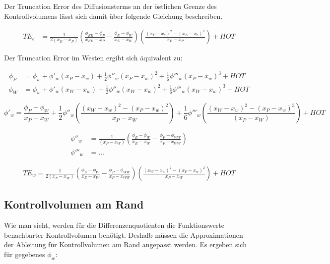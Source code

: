 \documentclass[10pt, ngerman,colorback,accentcolor=tud2d]{tudreport}
\begin{document}
Der Truncation Error des Diffusionsterms an der östlichen Grenze des Kontrollvolumens
lässt sich damit über folgende Gleichung beschreiben.

\begin{align*}
  {TE}_e &= \frac{1}{2 (x_E-x_P)}\left({
\frac{\phi_{EE}-\phi_P}{x_{EE}-x_P}-\frac{\phi_E-\phi_W}{x_E-x_W}}\right) \left({\frac{{(x_P-x_e)}^2-{(x_E-x_e)}^2}{x_E-x_P}}\right)+HOT
\end{align*}

Der Truncation Error im Westen ergibt sich äquivalent zu:

\begin{align}
  \phi_P &= \phi_w + \phi'_w(x_P-x_w)+\frac{1}{2}\phi''_w(x_P-x_w)^2
  +\frac{1}{6}\phi'''_w(x_P-x_w)^3+HOT
  \label{eq:taylor_wP}\\
  \phi_W &= \phi_w + \phi'_w(x_W-x_w)+\frac{1}{2}\phi''_w(x_W-x_w)^2
  +\frac{1}{6}\phi'''_w(x_W-x_w)^3+HOT
  \label{eq:taylor_eP}
\end{align}

\begin{equation}
  \phi'_w = \frac{\phi_P-\phi_W}{x_P-x_W}+\frac{1}{2}\phi''_w
\left({\frac{{(x_W-x_w)}^2-{(x_P-x_w)}^2}{x_P-x_W}}\right)+
\frac{1}{6} \phi'''_w \left({\frac{{(x_W-x_w)}^3-{(x_P-x_w)}^3}{(x_P-x_W)}}\right)+HOT
\end{equation}

\begin{align*}
  \phi''_w &= \frac{1}{(x_P-x_W)}\left({
\frac{\phi_{E}-\phi_W}{x_{E}-x_W}-\frac{\phi_P-\phi_{WW}}{x_P-x_{WW}}}\right)\\
 \phi'''_w &= \dots
\end{align*}

\begin{align*}
  TE_w = \frac{1}{2 (x_P-x_W)} \left({
\frac{\phi_{E}-\phi_W}{x_{E}-x_W}-\frac{\phi_P-\phi_{WW}}{x_P-x_{WW}}}\right)
  \left({\frac{{(x_W-x_w)}^2-{(x_P-x_w)}^2}{x_P-x_W}}\right)+HOT
\end{align*}

\subsection{Kontrollvolumen am Rand}

Wie man sieht, werden für die Differenzenquotienten die Funktionswerte benachbarter
Kontrollvolumen benötigt. Deshalb müssen die Approximationen der Ableitung für
Kontrollvolumen am Rand angepasst werden. Es ergeben sich für gegebenes $\phi_w$:
\end{document}
